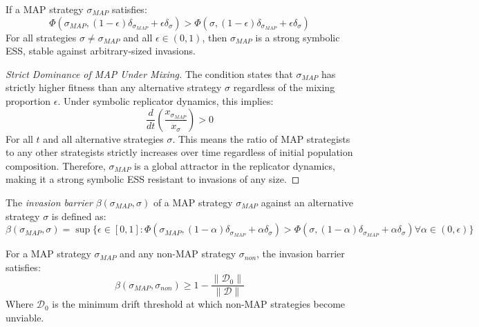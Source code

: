 \begin{theorem}
\label{theorem:bk5_map_as_strong_ess}
If a MAP strategy $\sigma_{MAP}$ satisfies:
\begin{equation}
\Phi(\sigma_{MAP}, (1-\epsilon)\delta_{\sigma_{MAP}} + \epsilon\delta_{\sigma}) > \Phi(\sigma, (1-\epsilon)\delta_{\sigma_{MAP}} + \epsilon\delta_{\sigma})
\end{equation}
For all strategies $\sigma \neq \sigma_{MAP}$ and all $\epsilon \in (0,1)$, then $\sigma_{MAP}$ is a strong symbolic ESS, stable against arbitrary-sized invasions.
\end{theorem}
\begin{proof}[Strict Dominance of MAP Under Mixing]
\label{proof:bk5_map_strict_fitness_dominance}
The condition states that $\sigma_{MAP}$ has strictly higher fitness than any alternative strategy $\sigma$ regardless of the mixing proportion $\epsilon$.
Under symbolic replicator dynamics, this implies:
\begin{equation}
\frac{d}{dt}\left(\frac{x_{\sigma_{MAP}}}{x_\sigma}\right) > 0
\end{equation}
For all $t$ and all alternative strategies $\sigma$. This means the ratio of MAP strategists to any other strategists strictly increases over time regardless of initial population composition.
Therefore, $\sigma_{MAP}$ is a global attractor in the replicator dynamics, making it a strong symbolic ESS resistant to invasions of any size.
\end{proof}
\begin{definition} \label{definition:bk5_symbolic_invasion_barrier}
The \emph{invasion barrier} $\beta(\sigma_{MAP}, \sigma)$ of a MAP strategy $\sigma_{MAP}$ against an alternative strategy $\sigma$ is defined as:
\begin{equation}
\beta(\sigma_{MAP}, \sigma) = \sup\{\epsilon \in [0,1] : \Phi(\sigma_{MAP}, (1-\alpha)\delta_{\sigma_{MAP}} + \alpha\delta_{\sigma}) > \Phi(\sigma, (1-\alpha)\delta_{\sigma_{MAP}} + \alpha\delta_{\sigma}) \forall \alpha \in (0,\epsilon)\}
\end{equation}
\end{definition}
\begin{lemma} \label{lemma:bk5_map_invasion_barrier_strength}
For a MAP strategy $\sigma_{MAP}$ and any non-MAP strategy $\sigma_{non}$, the invasion barrier satisfies:
\begin{equation}
\beta(\sigma_{MAP}, \sigma_{non}) \geq 1 - \frac{\|\mathcal{D}_0\|}{\|\mathcal{D}\|}
\end{equation}
Where $\mathcal{D}_0$ is the minimum drift threshold at which non-MAP strategies become unviable.
\end{lemma}
